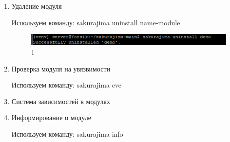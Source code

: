 \begin{enumerate}
\newpage

\item Удаление модуля

Используем команду: sakurajima uninstall name-module

\begin{figure}
  \centering
  \includegraphics[width=.8\textwidth]{graphics/test/dev_uninstall.png}
  \caption{1}
  \label{fig:test1}
\end{figure}

\item Проверка модуля на увязвимости

Используем команду: sakurajima cve

\item Система зависимостей в модулях

\item Информирование о модуле

Используем команду: sakurajima info


\end{enumerate}

